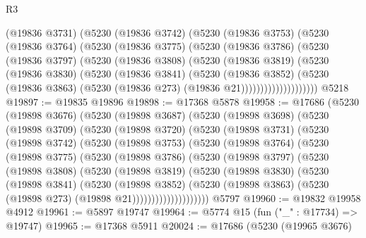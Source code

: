 \begin{lexlean}{R3}
\begin{coremodule}
                (@19836 @3731)
                (@5230
                  (@19836 @3742)
                  (@5230
                    (@19836 @3753)
                    (@5230
                      (@19836 @3764)
                      (@5230
                        (@19836 @3775)
                        (@5230
                          (@19836 @3786)
                          (@5230
                            (@19836 @3797)
                            (@5230
                              (@19836 @3808)
                              (@5230
                                (@19836 @3819)
                                (@5230
                                  (@19836 @3830)
                                  (@5230
                                    (@19836 @3841)
                                    (@5230
                                      (@19836 @3852)
                                      (@5230
                                        (@19836 @3863)
                                        (@5230 (@19836 @273) (@19836 @21))))))))))))))))))))
    @5218
@19897 := @19835 @19896
@19898 := @17368 @5878
@19958 := @17686
    (@5230
      (@19898 @3676)
      (@5230
        (@19898 @3687)
        (@5230
          (@19898 @3698)
          (@5230
            (@19898 @3709)
            (@5230
              (@19898 @3720)
              (@5230
                (@19898 @3731)
                (@5230
                  (@19898 @3742)
                  (@5230
                    (@19898 @3753)
                    (@5230
                      (@19898 @3764)
                      (@5230
                        (@19898 @3775)
                        (@5230
                          (@19898 @3786)
                          (@5230
                            (@19898 @3797)
                            (@5230
                              (@19898 @3808)
                              (@5230
                                (@19898 @3819)
                                (@5230
                                  (@19898 @3830)
                                  (@5230
                                    (@19898 @3841)
                                    (@5230
                                      (@19898 @3852)
                                      (@5230
                                        (@19898 @3863)
                                        (@5230 (@19898 @273) (@19898 @21))))))))))))))))))))
    @5797
@19960 := @19832 @19958 @4912
@19961 := @5897 @19747
@19964 := @5774 @15 (fun ("_" : @17734) => @19747)
@19965 := @17368 @5911
@20024 := @17686
    (@5230
      (@19965 @3676)

\end{coremodule}
\end{lexlean}
